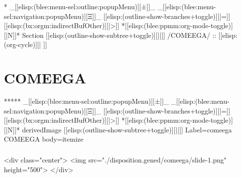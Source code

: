 \begin{whenOrg}
\begin{verblatex}
\begin{frame}[fragile,plain,label=dblocksEverywhere]


\end{frame}
\end{verblatex}


\begin{whenOrg}
*  _[[elisp:(blee:menu-sel:outline:popupMenu)][±]]_ _[[elisp:(blee:menu-sel:navigation:popupMenu)][Ξ]]_ [[elisp:(outline-show-branches+toggle)][|=]] [[elisp:(bx:orgm:indirectBufOther)][|>]] *[[elisp:(blee:ppmm:org-mode-toggle)][|N]]*  Section    [[elisp:(outline-show-subtree+toggle)][||]]   /COMEEGA/ ::  [[elisp:(org-cycle)][| ]]
\end{whenOrg}

\section{COMEEGA}


\begin{whenOrg}
*****  _[[elisp:(blee:menu-sel:outline:popupMenu)][±]]_ _[[elisp:(blee:menu-sel:navigation:popupMenu)][Ξ]]_ [[elisp:(outline-show-branches+toggle)][|=]] [[elisp:(bx:orgm:indirectBufOther)][|>]] *[[elisp:(blee:ppmm:org-mode-toggle)][|N]]*  derivedImage [[elisp:(outline-show-subtree+toggle)][||]] Label=comeega COMEEGA body=itemize
\end{whenOrg}

\begin{htmlonly}

\begin{frame}[fragile,plain,label=comeega]
    \frametitle{}
    \framesubtitle{}
    \begin{rawhtml}
<div class="center">
<img src="./disposition.gened/comeega/slide-1.png" height="500">
</div>
    \end{rawhtml}
\end{frame}
\end{htmlonly}


\end{whenOrg}

